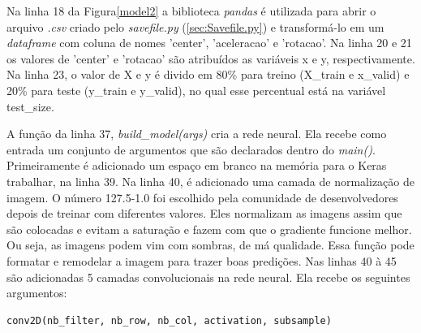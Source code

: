 Na linha 18 da Figura\ref{model2} a biblioteca \textit{pandas} é utilizada para abrir o arquivo \textit{.csv} criado pelo \textit{savefile.py} (\ref{sec:Savefile.py}) e transformá-lo em um \textit{dataframe} com coluna de nomes 'center', 'aceleracao' e 'rotacao'.
Na linha 20 e 21 os valores de 'center' e 'rotacao' são atribuídos as variáveis x e y, respectivamente. Na linha 23, o valor de X e y é divido em 80\% para treino (X\_train e x\_valid) e 20\% para teste (y\_train e y\_valid), no qual esse percentual está na variável test\_size.

	\begin{figure}[H]
		\centering
\end{figure}
A função da linha 37, \textit{build\_model(args)} cria a rede neural. Ela recebe como entrada um conjunto de argumentos que são declarados dentro do \textit{main()}.
Primeiramente é adicionado um espaço em branco na memória para o Keras trabalhar, na linha 39. 
Na linha 40, é adicionado uma camada de normalização de imagem. O número 127.5-1.0 foi escolhido pela comunidade de desenvolvedores depois de treinar com diferentes valores. Eles normalizam as imagens assim que são colocadas e evitam a saturação e fazem com que o gradiente funcione melhor. Ou seja, as imagens podem vim com sombras, de má qualidade. Essa função pode formatar e remodelar a imagem para trazer boas predições.
Nas linhas 40 à 45 são adicionadas 5 camadas convolucionais na rede neural. Ela recebe os seguintes argumentos: 

\begin{lstlisting}
conv2D(nb_filter, nb_row, nb_col, activation, subsample)
\end{lstlisting}

